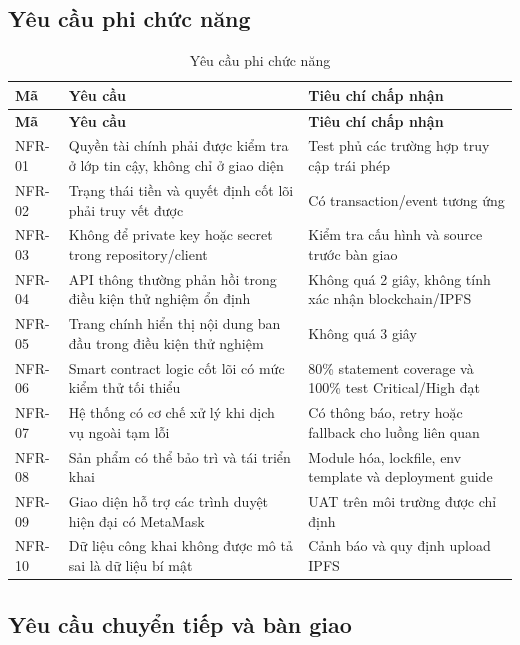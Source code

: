 \subsection{Yêu cầu phi chức năng}

\begin{longtable}{| p{1.3cm} | p{7.1cm} | p{4.4cm} |}
\caption{Yêu cầu phi chức năng}\label{tab:nfr}\\
\hline
\textbf{Mã} & \textbf{Yêu cầu} & \textbf{Tiêu chí chấp nhận} \\
\hline
\endfirsthead
\hline
\textbf{Mã} & \textbf{Yêu cầu} & \textbf{Tiêu chí chấp nhận} \\
\hline
\endhead
NFR-01 & Quyền tài chính phải được kiểm tra ở lớp tin cậy, không chỉ ở giao diện & Test phủ các trường hợp truy cập trái phép \\ \hline
NFR-02 & Trạng thái tiền và quyết định cốt lõi phải truy vết được & Có transaction/event tương ứng \\ \hline
NFR-03 & Không để private key hoặc secret trong repository/client & Kiểm tra cấu hình và source trước bàn giao \\ \hline
NFR-04 & API thông thường phản hồi trong điều kiện thử nghiệm ổn định & Không quá 2 giây, không tính xác nhận blockchain/IPFS \\ \hline
NFR-05 & Trang chính hiển thị nội dung ban đầu trong điều kiện thử nghiệm & Không quá 3 giây \\ \hline
NFR-06 & Smart contract logic cốt lõi có mức kiểm thử tối thiểu & 80\% statement coverage và 100\% test Critical/High đạt \\ \hline
NFR-07 & Hệ thống có cơ chế xử lý khi dịch vụ ngoài tạm lỗi & Có thông báo, retry hoặc fallback cho luồng liên quan \\ \hline
NFR-08 & Sản phẩm có thể bảo trì và tái triển khai & Module hóa, lockfile, env template và deployment guide \\ \hline
NFR-09 & Giao diện hỗ trợ các trình duyệt hiện đại có MetaMask & UAT trên môi trường được chỉ định \\ \hline
NFR-10 & Dữ liệu công khai không được mô tả sai là dữ liệu bí mật & Cảnh báo và quy định upload IPFS \\
\hline
\end{longtable}

\iffalse
\subsection{Yêu cầu chuyển tiếp và bàn giao}

